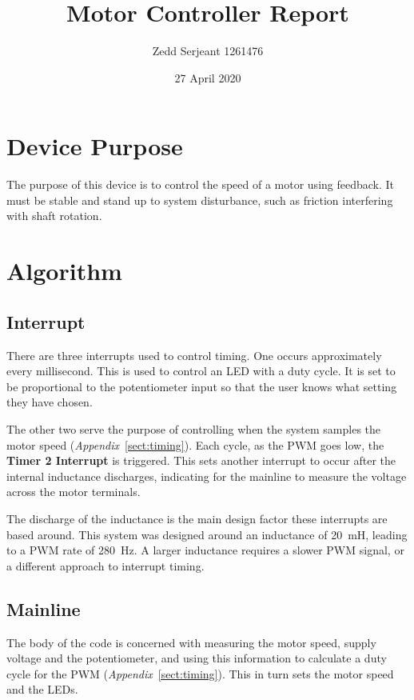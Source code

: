 \documentclass[a4paper]{article}
\title{Motor Controller Report}
\author{Zedd Serjeant 1261476}
\date{27 April 2020}
\begin{document}
\maketitle

\section{Device Purpose}
The purpose of this device is to control the speed of a motor using feedback. It must be stable and stand up to system disturbance, such as friction interfering with shaft rotation.

\section{Algorithm}

\subsection{Interrupt} \label{subsect:interrupt}
There are three interrupts used to control timing. One occurs approximately every millisecond. This is used to control an LED with a duty cycle. It is set to be proportional to the potentiometer input so that the user knows what setting they have chosen.

The other two serve the purpose of controlling when the system samples the motor speed (\textit{Appendix}~\ref{sect:timing}). Each cycle, as the PWM goes low, the \textbf{Timer 2 Interrupt} is triggered. This sets another interrupt to occur after the internal inductance discharges, indicating for the mainline to measure the voltage across the motor terminals.

The discharge of the inductance is the main design factor these interrupts are based around. This system was designed around an inductance of \SI{20}{\milli\henry}, leading to a PWM rate of \SI{280}{\hertz}. A larger inductance requires a slower PWM signal, or a different approach to interrupt timing. 

\subsection{Mainline}
The body of the code is concerned with measuring the motor speed, supply voltage and the potentiometer, and using this information to calculate a duty cycle for the PWM (\textit{Appendix}~\ref{sect:timing}). This in turn sets the motor speed and the LEDs.
\end{document}
